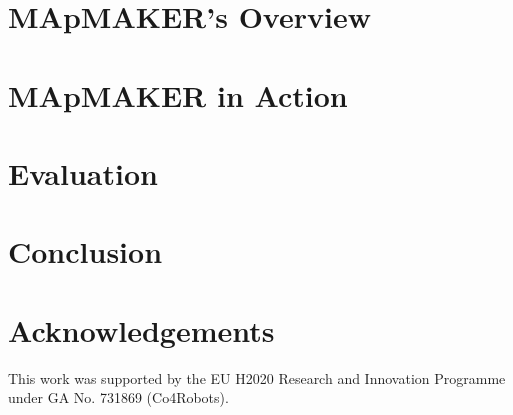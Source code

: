 \documentclass[10pt,conference]{IEEEtran}
\begin{document}
	\section{MApMAKER's Overview}
	\label{sec:approach}
	
	
	\section{MApMAKER in Action}
	\label{sec:tool}
	
	
	
	\section{Evaluation}
	\label{sec:evaluation}
	
	
	
	\section{Conclusion}
	\label{sec:conclusion}
	

\section*{Acknowledgements}
This work was supported by the EU H2020 Research and Innovation Programme under GA No. 731869 (Co4Robots).

	\balance
	
	
	
\end{document}

